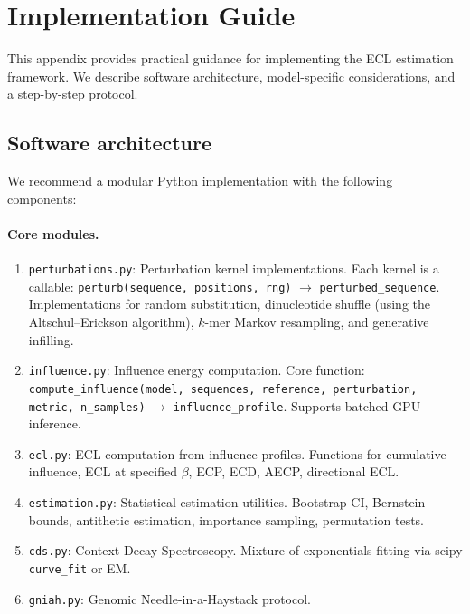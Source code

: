 \section{Implementation Guide}\label{app:implementation}

This appendix provides practical guidance for implementing the ECL estimation framework. We describe software architecture, model-specific considerations, and a step-by-step protocol.

\subsection{Software architecture}

We recommend a modular Python implementation with the following components:

\paragraph{Core modules.}
\begin{enumerate}[leftmargin=2em, label=(\roman*)]
\item \texttt{perturbations.py}: Perturbation kernel implementations. Each kernel is a callable: \texttt{perturb(sequence, positions, rng)} $\to$ \texttt{perturbed\_sequence}. Implementations for random substitution, dinucleotide shuffle (using the Altschul--Erickson algorithm), $k$-mer Markov resampling, and generative infilling.
\item \texttt{influence.py}: Influence energy computation. Core function: \texttt{compute\_influence(model, sequences, reference, perturbation, metric, n\_samples)} $\to$ \texttt{influence\_profile}. Supports batched GPU inference.
\item \texttt{ecl.py}: ECL computation from influence profiles. Functions for cumulative influence, ECL at specified $\beta$, ECP, ECD, AECP, directional ECL.
\item \texttt{estimation.py}: Statistical estimation utilities. Bootstrap CI, Bernstein bounds, antithetic estimation, importance sampling, permutation tests.
\item \texttt{cds.py}: Context Decay Spectroscopy. Mixture-of-exponentials fitting via scipy \texttt{curve\_fit} or EM.
\item \texttt{gniah.py}: Genomic Needle-in-a-Haystack protocol.
\end{enumerate}

